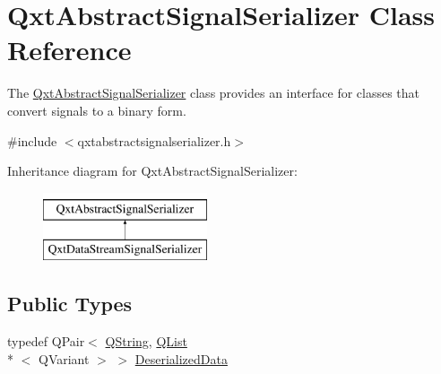 \hypertarget{class_qxt_abstract_signal_serializer}{\section{Qxt\-Abstract\-Signal\-Serializer Class Reference}
\label{class_qxt_abstract_signal_serializer}
}


The \hyperlink{class_qxt_abstract_signal_serializer}{Qxt\-Abstract\-Signal\-Serializer} class provides an interface for classes that convert signals to a binary form.  




{\ttfamily \#include $<$qxtabstractsignalserializer.\-h$>$}

Inheritance diagram for Qxt\-Abstract\-Signal\-Serializer\-:\begin{figure}[H]
\begin{center}
\leavevmode
\includegraphics[height=2.000000cm]{class_qxt_abstract_signal_serializer}
\end{center}
\end{figure}
\subsection*{Public Types}
\begin{DoxyCompactItemize}
\item 
typedef Q\-Pair$<$ \hyperlink{group___u_a_v_objects_plugin_gab9d252f49c333c94a72f97ce3105a32d}{Q\-String}, \hyperlink{class_q_list}{Q\-List}\\*
$<$ Q\-Variant $>$ $>$ \hyperlink{class_qxt_abstract_signal_serializer_a101019f7e2f0c3267e01c1da89104b40}{Deserialized\-Data}
\end{DoxyCompactItemize}
